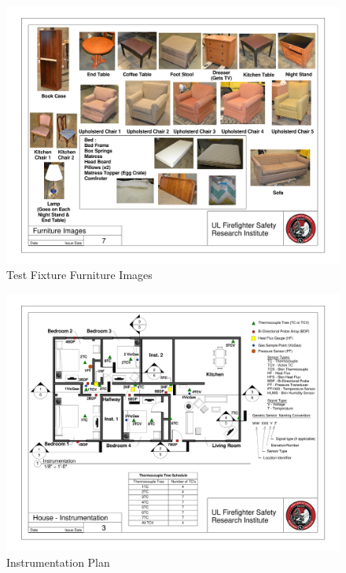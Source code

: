 \begin{figure}
\includegraphics[width=\textheight]{../0_Images/Appendix_Figures/Furniture_Images}
\caption[]{Test Fixture Furniture Images}
\label{fig:appendix_furnitureimages}
\end{figure}

\begin{figure}
\includegraphics[width=\textheight]{../0_Images/Appendix_Figures/Instrument_Plan}
\caption[]{Instrumentation Plan}
\label{fig:appendix_instruments}
\end{figure}

